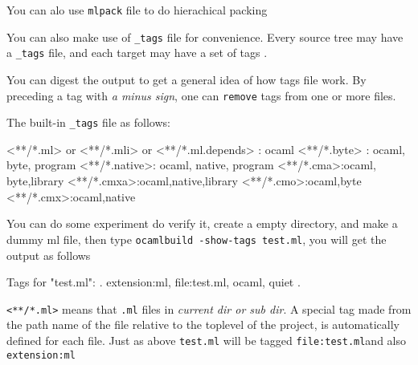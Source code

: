 You can alo use  \verb|mlpack| file to do hierachical packing 

You can also make use of \verb|_tags| file for convenience.  Every
source tree may have a \verb|_tags| file, and each target may have a
set of tags .


 You can digest the output to get a general idea of how tags file
 work.  By preceding a tag with \textit{a minus sign}, one can
 \verb|remove| tags from one or more files.

The built-in \verb|_tags| file as follows:

\begin{bashcode}
<**/*.ml>   or <**/*.mli> or <**/*.ml.depends> : ocaml 
<**/*.byte> : ocaml, byte, program 
<**/*.native>: ocaml, native, program
<**/*.cma>:ocaml, byte,library
<**/*.cmxa>:ocaml,native,library
<**/*.cmo>:ocaml,byte
<**/*.cmx>:ocaml,native
\end{bashcode}
You can do some experiment do verify it, create a empty directory, and
make a dummy ml file, then type \verb|ocamlbuild -show-tags test.ml|,
you will get the output as follows 

\begin{bashcode}
Tags for "test.ml": {. extension:ml, file:test.ml, ocaml, quiet .}
\end{bashcode}

\verb|<**/*.ml>| means that \verb|.ml| files in \emph{current dir or
  sub dir}. A special tag made from the path name of the file relative
to the toplevel of the project, is automatically defined for each
file.  Just as above \verb|test.ml| will be tagged
\verb|file:test.ml|and also \verb|extension:ml|

